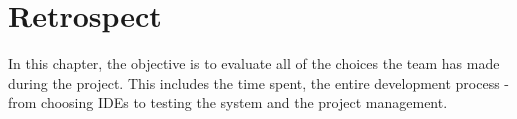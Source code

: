 \chapter{Retrospect}
In this chapter, the objective is to evaluate all of the choices the team has made during the project. This includes the time spent, the entire development process - from choosing IDEs to testing the system and the project management. 











\begin{comment}

\section{Development process}
In this section all of the problems and solutions related to the development process will be discussed and evaluated. This involves problems related to scrum, to the team organization and the technical choices the team has made during the project. 
\end{comment}




